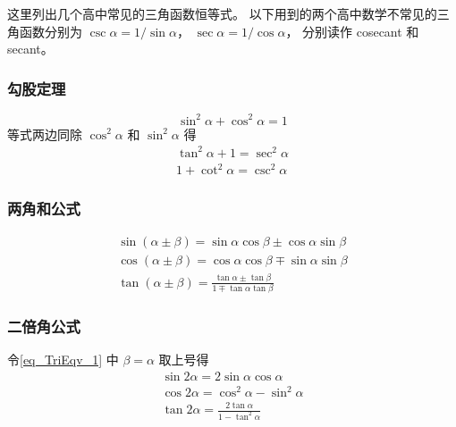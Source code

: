 

这里列出几个高中常见的三角函数恒等式。 以下用到的两个高中数学不常见的三角函数分别为 $\csc \alpha= 1/\sin \alpha$， $\sec \alpha = 1/\cos \alpha$， 分别读作 cosecant 和 secant。

\subsubsection{勾股定理}
\begin{equation}
\sin^2 \alpha + \cos^2 \alpha = 1
\end{equation}
等式两边同除 $\cos^2 \alpha$ 和 $\sin^2 \alpha$ 得
\begin{gather}
\label{eq_TriEqv_13}
\tan^2 \alpha + 1 = \sec^2 \alpha\\
1 + \cot^2\alpha = \csc^2\alpha
\end{gather}

\subsubsection{两角和公式}
\begin{gather}\label{eq_TriEqv_1}
\sin(\alpha\pm \beta) = \sin \alpha\cos \beta \pm \cos \alpha\sin \beta\\
\label{eq_TriEqv_2}
\cos(\alpha\pm \beta) = \cos \alpha\cos \beta \mp \sin \alpha\sin \beta\\
\tan(\alpha\pm \beta) = \frac{\tan \alpha \pm \tan \beta}{1 \mp \tan \alpha \tan \beta}
\end{gather}

\subsubsection{二倍角公式}

令\autoref{eq_TriEqv_1} 中 $\beta=\alpha$ 取上号得
\begin{gather}
\sin 2\alpha = 2\sin \alpha\cos \alpha\\
\label{eq_TriEqv_4}
\cos 2\alpha = \cos^2 \alpha - \sin^2 \alpha\\
\tan 2\alpha = \frac{2\tan \alpha}{1 - \tan^2 \alpha}
\end{gather}

